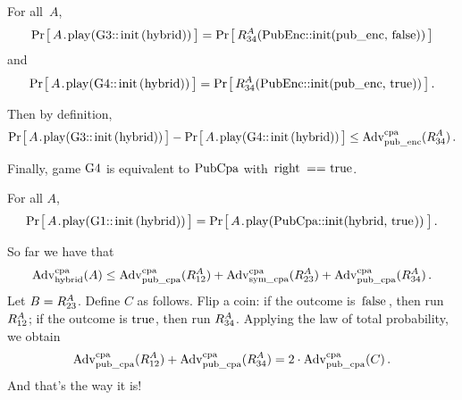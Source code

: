 \begin{claim}[Reduction]
  For all~$A$,
  \[
    \Prob{A\code{.play(G3::init(hybrid))}} =
    \Prob{R_{\code{34}}^A(\code{PubEnc::init(pub_enc, false)})}
  \]
  and
  \[
    \Prob{A\code{.play(G4::init(hybrid))}} =
    \Prob{R_{\code{34}}^A(\code{PubEnc::init(pub_enc, true)})} \,.
  \]
\end{claim}
%
%
Then by definition,
%
\[
  \Prob{A\code{.play(G3::init(hybrid))}} -
  \Prob{A\code{.play(G4::init(hybrid))}} \leq
  \Adv{cpa}_\code{pub_enc}(R_{\code{34}}^A) \,.
\]

Finally, game $\code{G4}$ is equivalent to $\code{PubCpa}$ with $\code{right ==
true}$.
%
\begin{claim}
  For all $A$,
  \[
     \Prob{A\code{.play(G1::init(hybrid))}} =
     \Prob{A\code{.play(PubCpa::init(hybrid, true))}} \,.
  \]
\end{claim}
%

So far we have that
%
\[
  \Adv{cpa}_\code{hybrid}(A) \leq
    \Adv{cpa}_\code{pub_cpa}(R_{\code{12}}^A) +
    \Adv{cpa}_\code{sym_cpa}(R_{\code{23}}^A) +
    \Adv{cpa}_\code{pub_cpa}(R_{\code{34}}^A) \,.
\]
%
Let $B = R_{\code{23}}^A$.
%
Define $C$ as follows. Flip a coin: if the outcome is $\code{false}$, then run
$R_{\code{12}}^A$; if the outcome is $\code{true}$, then run $R_{\code{34}}^A$.
%
Applying the law of total probability, we obtain
%
%
\[
  \Adv{cpa}_\code{pub_cpa}(R_{\code{12}}^A) +
  \Adv{cpa}_\code{pub_cpa}(R_{\code{34}}^A)
  = 2\cdot \Adv{cpa}_\code{pub_cpa}(C) \,.
\]
%
And that's the way it is!
